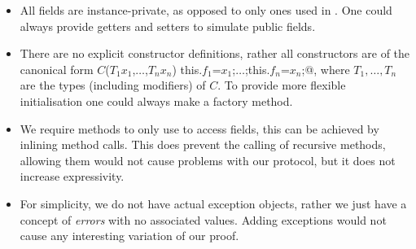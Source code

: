 \begin{itemize}
\item All fields are instance-private, as opposed to only \Q@capsule@ ones used in \Q@invariant@. One could always provide getters and setters to simulate public fields.
\item There are no explicit constructor definitions, rather all constructors are of the canonical form
\Q@$C$($T_1 x_1$,$\ldots$,$T_n x_n$) {this.$f_1$=$x_1$;$\ldots$;this.$f_n$=$x_n$;}@,
 where $T_1, \ldots, T_n$ are the types (including modifiers) of $C$.
To provide more flexible initialisation one could always make a factory method.
\item We require \validate{} methods to only use \Q@this@ to access fields,
this can be achieved by inlining method calls.
This does prevent the calling of recursive methods,
allowing them would not cause problems with our protocol,
but it does not increase expressivity.
\item For simplicity, we do not have actual exception objects,
rather we just have a concept of \emph{errors} with no associated values.
Adding \Q@imm@ exceptions would not cause any interesting variation of our proof.
\end{itemize}


